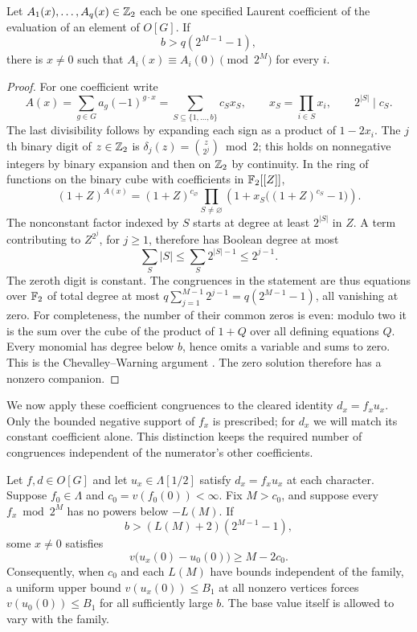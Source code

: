 \begin{lemma}
\label{lem:h:boolean-coefficients}
Let $A_1(x),\ldots,A_q(x)\in\mathbb Z_2$ each be one specified Laurent
coefficient of the evaluation of an element of $O[G]$. If
\[
 b>q(2^{M-1}-1),
\]
there is $x\ne0$ such that
$A_i(x)\equiv A_i(0)\pmod{2^M}$ for every $i$.
\end{lemma}

\begin{proof}
For one coefficient write
\[
 A(x)=\sum_{g\in G}a_g(-1)^{g\cdot x}
     =\sum_{S\subseteq\{1,\ldots,b\}}c_Sx_S,
 \qquad x_S=\prod_{i\in S}x_i,
 \qquad 2^{|S|}\mid c_S.
\]
The last divisibility follows by expanding each sign as a product of
$1-2x_i$. The $j$th binary digit of $z\in\mathbb Z_2$ is
$\delta_j(z)=\binom z{2^j}\bmod2$; this holds on nonnegative integers
by binary expansion and then on $\mathbb Z_2$ by continuity. In the ring
of functions on the binary cube with coefficients in $\mathbb F_2[[Z]]$,
\[
 (1+Z)^{A(x)}=(1+Z)^{c_\varnothing}
  \prod_{S\ne\varnothing}
    \left(1+x_S\big((1+Z)^{c_S}-1\big)\right).
\]
The nonconstant factor indexed by $S$ starts at degree at least
$2^{|S|}$ in $Z$. A term contributing to $Z^{2^j}$, for $j\ge1$,
therefore has Boolean degree at most
\[
 \sum_S|S|\le\sum_S2^{|S|-1}\le2^{j-1}.
\]
The zeroth digit is constant. The congruences in the statement are
thus equations over $\mathbb F_2$ of total degree at most
$q\sum_{j=1}^{M-1}2^{j-1}=q(2^{M-1}-1)$, all vanishing at zero.
For completeness, the number of their common zeros is even: modulo
two it is the sum over the cube of the product of $1+Q$ over all
defining equations $Q$. Every monomial has degree below $b$, hence
omits a variable and sums to zero. This is the
Chevalley--Warning argument \citep{Chevalley1935,Warning1935}. The zero solution therefore has a
nonzero companion.
\end{proof}

We now apply these coefficient congruences to the cleared identity
$d_x=f_xu_x$. Only the bounded negative support of $f_x$ is prescribed;
for $d_x$ we will match its constant coefficient alone. This distinction
keeps the required number of congruences independent of the numerator's
other coefficients.

\begin{lemma}
\label{lem:h:boolean-transfer}
Let $f,d\in O[G]$ and let $u_x\in\Lambda[1/2]$ satisfy
$d_x=f_xu_x$ at each character. Suppose
$f_0\in\Lambda$ and $c_0=v(f_0(0))<\infty$. Fix $M>c_0$, and
suppose every $f_x\bmod2^M$ has no powers below $-L(M)$. If
\begin{equation}\label{eq:h:cube-threshold}
 b>(L(M)+2)(2^{M-1}-1),
\end{equation}
some $x\ne0$ satisfies
\begin{equation}\label{eq:h:central-transfer}
 v\bigl(u_x(0)-u_0(0)\bigr)\ge M-2c_0.
\end{equation}
Consequently, when $c_0$ and each $L(M)$ have bounds independent of
the family, a uniform upper bound $v(u_x(0))\le B_1$ at all nonzero
vertices forces $v(u_0(0))\le B_1$ for all sufficiently large $b$.
The base value itself is allowed to vary with the family.
\end{lemma}

